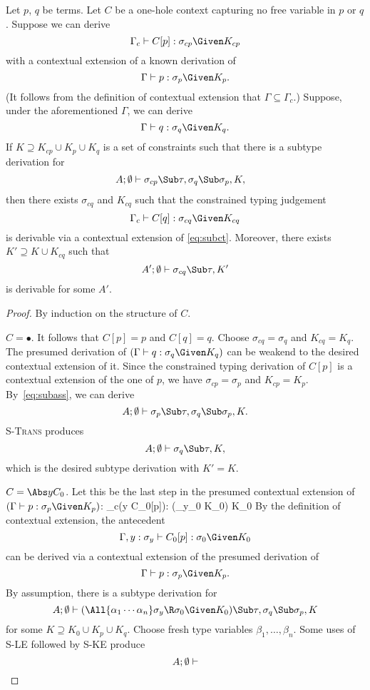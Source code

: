 Let $p$, $q$ be terms. Let $C$ be a one-hole context capturing no
free variable in $p$ or $q$. Suppose we can derive
\[
\Gamma_c\vdash C[p]:\sigma_{cp}\Given K_{cp}
\]
with a contextual extension of a known derivation of
\[
\Gamma\vdash p:\sigma_p \Given K_p.
\]
(It follows from the definition of contextual extension that
$\Gamma\subseteq\Gamma_c$.) Suppose, under the aforementioned
$\Gamma$, we can derive
\begin{equation}
\Gamma\vdash q:\sigma_q \Given K_q.
\label{eq:subct}
\end{equation}
If $K\supseteq K_{cp}\cup K_p\cup K_q$ is a set of constraints
such that there is a subtype derivation for
\begin{align}
A;\Exi&\vdash
\sigma_{cp}\Sub\tau,
\sigma_q\Sub\sigma_p,
K,
\label{eq:subass}
\end{align}
then there exists $\sigma_{cq}$ and $K_{cq}$ such that the
constrained typing judgement
\[
\Gamma_c \vdash C[q]: \sigma_{cq}\Given K_{cq}
\]
is derivable via a contextual extension of \eqref{eq:subct}.
Moreover, there exists $K'\supseteq K\cup K_{cq}$ such that
\[
A';\Exi \vdash \sigma_{cq}\Sub\tau,K'
\]
is derivable for some $A'$.

\begin{proof}
By induction on the structure of $C$.

\Case$C=\bullet$. It follows that $C[p]=p$ and $C[q]=q$. Choose
$\sigma_{cq}=\sigma_q$ and $K_{cq}=K_q$. The presumed derivation
of $(\Gamma\vdash q:\sigma_q\Given K_q)$ can be weakend to the
desired contextual extension of it. Since the constrained typing
derivation of $C[p]$ is a contextual extension of the one of $p$,
we have $\sigma_{cp}=\sigma_p$ and $K_{cp}=K_p$.
By~\eqref{eq:subass}, we can derive
\[
A;\Exi\vdash \sigma_p\Sub\tau,\sigma_q\Sub\sigma_p,K.
\]
\textsc{S-Trans} produces
\[
A;\Exi\vdash \sigma_q\Sub\tau,K,
\]
which is the desired subtype derivation with $K'=K$.

\Case$C=\Abs y C_0$. Let this be the last step in the presumed
contextual extension of $(\Gamma\vdash p:\sigma_p\Given K_p)$:
{\Gamma_c\vdash(\Abs y C_0[p]):
(\sigma_y\R\sigma_0 \Given K_0)\Given
K_0
}%
By the definition of contextual extension, the antecedent
\[
\Gamma,y:\sigma_y \vdash C_0[p] : \sigma_0 \Given K_0
\]
can be derived via a contextual extension of the presumed
derivation of
\[
\Gamma\vdash p:\sigma_p\Given K_p.
\]
By assumption, there is a subtype derivation for
\[
A;\Exi\vdash
(\All{\alpha_1\cdots\alpha_n}\sigma_y\R\sigma_0 \Given K_0)
\Sub\tau,
\sigma_q\Sub\sigma_p,K
\]
for some $K\supseteq K_0\cup K_p\cup K_q$. Choose fresh type
variables $\beta_1,\ldots,\beta_n$. Some uses of \textsc{S-LE}
followed by \textsc{S-KE} produce
\[
A;\emptyset\vdash
\]
\end{proof}
